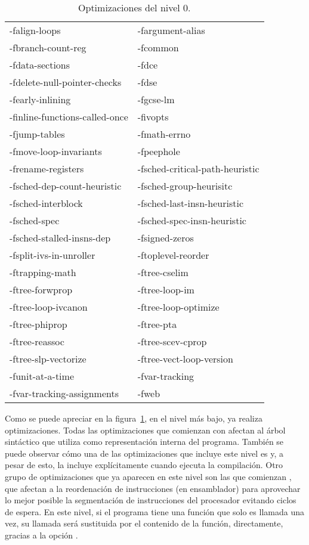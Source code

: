 \begin{table}[htb]
\begin{center}
	\begin{tabular}{ll}
		-falign-loops & -fargument-alias\\
		-fbranch-count-reg & -fcommon\\
		-fdata-sections & -fdce\\
		-fdelete-null-pointer-checks & -fdse\\
		-fearly-inlining & -fgcse-lm\\
		-finline-functions-called-once & -fivopts\\
		-fjump-tables & -fmath-errno\\
		-fmove-loop-invariants & -fpeephole\\
		-frename-registers & -fsched-critical-path-heuristic\\
		-fsched-dep-count-heuristic & -fsched-group-heurisitc\\
		-fsched-interblock & -fsched-last-insn-heuristic\\
		-fsched-spec & -fsched-spec-insn-heuristic\\
		-fsched-stalled-insns-dep & -fsigned-zeros\\
		-fsplit-ivs-in-unroller & -ftoplevel-reorder\\
		-ftrapping-math & -ftree-cselim\\
		-ftree-forwprop & -ftree-loop-im\\
		-ftree-loop-ivcanon & -ftree-loop-optimize\\
		-ftree-phiprop & -ftree-pta\\
		-ftree-reassoc & -ftree-scev-cprop\\
		-ftree-slp-vectorize & -ftree-vect-loop-version\\
		-funit-at-a-time & -fvar-tracking\\
		-fvar-tracking-assignments & -fweb\\
	\end{tabular}
\end{center}
\caption{Optimizaciones del nivel 0.}
\label{opt0}
\end{table}

Como se puede apreciar en la figura~\ref{opt0}, en el nivel más bajo,  ya realiza optimizaciones. Todas las optimizaciones que comienzan con  afectan al árbol sintáctico que utiliza  como representación interna del programa. También se puede observar cómo una de las optimizaciones que incluye este nivel es  y, a pesar de esto,  la incluye explícitamente cuando ejecuta la compilación. Otro grupo de optimizaciones que ya aparecen en este nivel son las que comienzan , que afectan a la reordenación de instrucciones (en ensamblador) para aprovechar lo mejor posible la segmentación de instrucciones del procesador evitando ciclos de espera. En este nivel, si el programa tiene una función que solo es llamada una vez, su llamada será sustituida por el contenido de la función, directamente, gracias a la opción .

